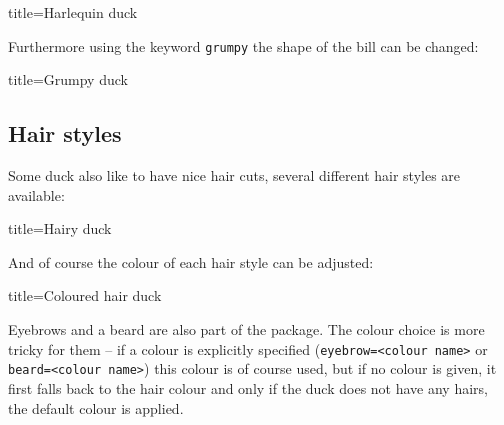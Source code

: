\documentclass[parskip=half]{scrartcl}
\begin{document}
\begin{tcblisting}{title={Harlequin duck}}
\begin{tikzpicture}
	\duck[body=yellow,
		head=yellow!50!orange, 
		bill=red,
		eye=green]
\end{tikzpicture}
\end{tcblisting}

Furthermore using the keyword \lstinline|grumpy| the shape of the bill can be changed:

\begin{tcblisting}{title={Grumpy duck}}
\begin{tikzpicture}
	\duck[grumpy]
\end{tikzpicture}
\begin{tikzpicture}
	\duck[grumpy, bill=cyan]
\end{tikzpicture}
\end{tcblisting}

\clearpage
\subsection{Hair styles}

Some duck also like to have nice hair cuts, several different hair styles are available:
\begin{tcblisting}{title={Hairy duck}}
\begin{tikzpicture}
	\duck[longhair]
\end{tikzpicture}
\begin{tikzpicture}
	\duck[shorthair]
\end{tikzpicture}

\begin{tikzpicture}
	\duck[crazyhair]
\end{tikzpicture}
\begin{tikzpicture}
	\duck[recedinghair]
\end{tikzpicture}
\end{tcblisting}

And of course the colour of each hair style can be adjusted:
\begin{tcblisting}{title={Coloured hair duck}}
\begin{tikzpicture}
	\duck[longhair=teal]
\end{tikzpicture}
\end{tcblisting}

Eyebrows and a beard are also part of the package. The colour choice is more tricky for them -- if a colour is explicitly specified (\lstinline|eyebrow=<colour name>| or \lstinline|beard=<colour name>|) this colour is of course used, but if no colour is given, it first falls back to the hair colour and only if the duck does not have any hairs, the default colour is applied.
\end{document}
